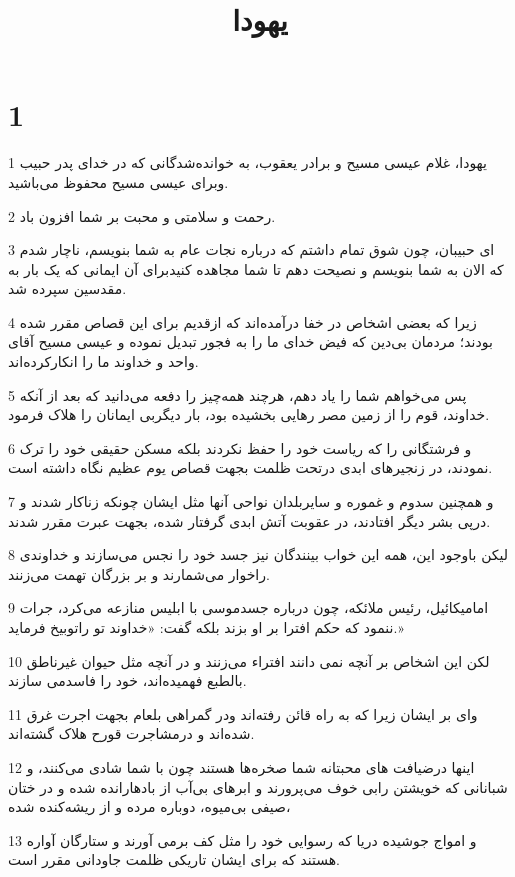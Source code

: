 

\title{يهودا}


\chapter{1}

\par 1 یهودا، غلام عیسی مسیح و برادر یعقوب، به خوانده‌شدگانی که در خدای پدر حبیب وبرای عیسی مسیح محفوظ می‌باشید.
\par 2 رحمت و سلامتی و محبت بر شما افزون باد.
\par 3 ‌ای حبیبان، چون شوق تمام داشتم که درباره نجات عام به شما بنویسم، ناچار شدم که الان به شما بنویسم و نصیحت دهم تا شما مجاهده کنیدبرای آن ایمانی که یک بار به مقدسین سپرده شد.
\par 4 زیرا که بعضی اشخاص در خفا درآمده‌اند که ازقدیم برای این قصاص مقرر شده بودند؛ مردمان بی‌دین که فیض خدای ما را به فجور تبدیل نموده و عیسی مسیح آقای واحد و خداوند ما را انکارکرده‌اند.
\par 5 پس می‌خواهم شما را یاد دهم، هرچند همه‌چیز را دفعه می‌دانید که بعد از آنکه خداوند، قوم را از زمین مصر رهایی بخشیده بود، بار دیگربی ایمانان را هلاک فرمود.
\par 6 و فرشتگانی را که ریاست خود را حفظ نکردند بلکه مسکن حقیقی خود را ترک نمودند، در زنجیرهای ابدی درتحت ظلمت بجهت قصاص یوم عظیم نگاه داشته است.
\par 7 و همچنین سدوم و غموره و سایربلدان نواحی آنها مثل ایشان چونکه زناکار شدند و در‌پی بشر دیگر افتادند، در عقوبت آتش ابدی گرفتار شده، بجهت عبرت مقرر شدند.
\par 8 لیکن باوجود این، همه این خواب بینندگان نیز جسد خود را نجس می‌سازند و خداوندی راخوار می‌شمارند و بر بزرگان تهمت می‌زنند.
\par 9 امامیکائیل، رئیس ملائکه، چون درباره جسدموسی با ابلیس منازعه می‌کرد، جرات ننمود که حکم افترا بر او بزند بلکه گفت: «خداوند تو راتوبیخ فرماید.»
\par 10 لکن این اشخاص بر آنچه نمی دانند افتراء می‌زنند و در آنچه مثل حیوان غیرناطق بالطبع فهمیده‌اند، خود را فاسدمی سازند.
\par 11 وای بر ایشان زیرا که به راه قائن رفته‌اند ودر گمراهی بلعام بجهت اجرت غرق شده‌اند و درمشاجرت قورح هلاک گشته‌اند.
\par 12 اینها درضیافت های محبتانه شما صخره‌ها هستند چون با شما شادی می‌کنند، و شبانانی که خویشتن رابی خوف می‌پرورند و ابرهای بی‌آب از بادهارانده شده و در ختان صیفی بی‌میوه، دوباره مرده و از ریشه‌کنده شده،
\par 13 و امواج جوشیده دریا که رسوایی خود را مثل کف برمی آورند و ستارگان آواره هستند که برای ایشان تاریکی ظلمت جاودانی مقرر است.
